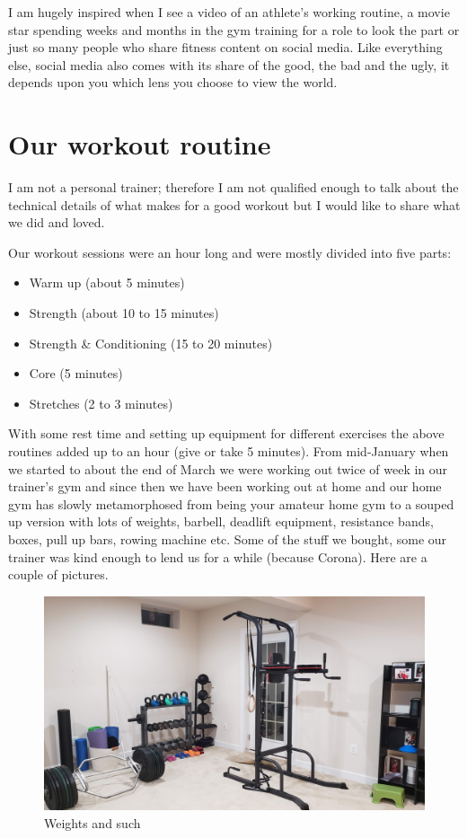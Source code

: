 \documentclass[
  oneside]{book}
\providecommand{\tightlist}{%
  \setlength{\itemsep}{0pt}\setlength{\parskip}{0pt}}
\begin{document}
I am hugely inspired when I see a video of an athlete's working routine, a movie star spending weeks and months in the gym training for a role to look the part or just so many people who share fitness content on social media. Like everything else, social media also comes with its share of the good, the bad and the ugly, it depends upon you which lens you choose to view the world.

\hypertarget{our-workout-routine}{%
\section{Our workout routine}\label{our-workout-routine}}

I am not a personal trainer; therefore I am not qualified enough to talk about the technical details of what makes for a good workout but I would like to share what we did and loved.

Our workout sessions were an hour long and were mostly divided into five parts:

\begin{itemize}
\tightlist
\item
  Warm up (about 5 minutes)
\item
  Strength (about 10 to 15 minutes)
\item
  Strength \& Conditioning (15 to 20 minutes)
\item
  Core (5 minutes)
\item
  Stretches (2 to 3 minutes)
\end{itemize}

With some rest time and setting up equipment for different exercises the above routines added up to an hour (give or take 5 minutes). From mid-January when we started to about the end of March we were working out twice of week in our trainer's gym and since then we have been working out at home and our home gym has slowly metamorphosed from being your amateur home gym to a souped up version with lots of weights, barbell, deadlift equipment, resistance bands, boxes, pull up bars, rowing machine etc. Some of the stuff we bought, some our trainer was kind enough to lend us for a while (because Corona). Here are a couple of pictures.

\begin{figure}
\centering
\includegraphics{pictures/gym2.jpg}
\caption{Weights and such}
\end{figure}
\end{document}
